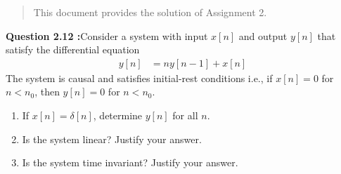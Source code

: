 \documentclass[journal,12pt,twocolumn]{IEEEtran}
\begin{document}
% 







\maketitle


\tableofcontents


\renewcommand{\thefigure}{\theenumi}
\renewcommand{\thetable}{\theenumi}



\bigskip

\begin{abstract}
This document provides the solution of Assignment 2.
\end{abstract}

\textbf{Question 2.12 :}Consider a system with input $x[n]$ and output $y[n]$ that satisfy the differential equation 
   \begin{align}
	   y[n] &= ny[n-1] + x[n]\label{def:diff}
   \end{align}
The system is causal and satisfies initial-rest conditions i.e., if $x[n] = 0$ for $n < n_{0}$, then $y[n] = 0$ for $n < n_{0}$.
\begin{enumerate}[label = (\alph*)]
	\item If $x[n] = \delta[n]$, determine $y[n]$ for all $n$.
        \item Is the system linear? Justify your answer.
        \item Is the system time invariant? Justify your answer.
\end{enumerate}
\end{document}
